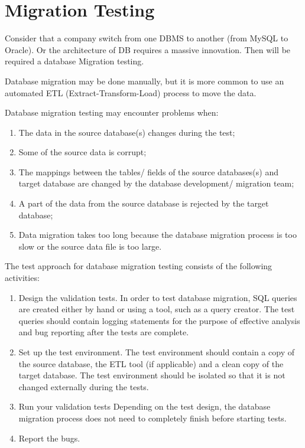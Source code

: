 \section{Migration Testing}
\label{sec:Migration Testing}

Consider that a company switch from one DBMS to another (from MySQL to Oracle). Or the architecture of DB requires a massive innovation. Then will be required a database Migration testing.

Database migration may be done manually, but it is more common to use an automated ETL (Extract-Transform-Load) process to move the data.

Database migration testing may encounter problems when:
\begin{enumerate}
 \item The data in the source database(s) changes during the test;
 \item Some of the source data is corrupt;
 \item The mappings between the tables/ fields of the source databases(s) and target database are changed by the database development/ migration team;
 \item A part of the data from the source database is rejected by the target database;
 \item Data migration takes too long because the database migration process is too slow or the source data file is too large.
 \end{enumerate}
 
 The test approach for database migration testing consists of the following activities:
 
\begin{enumerate}
 \item  
 Design the validation tests. In order to test database migration, SQL queries are created either by hand or using a tool, such as a query creator. The test queries should contain logging statements for the purpose of effective analysis and bug reporting after the tests are complete.
 \item Set up the test environment. The test environment should contain a copy of the source database, the ETL tool (if applicable) and a clean copy of the target database. The test environment should be isolated so that it is not changed externally during the tests.
 \item Run your validation tests Depending on the test design, the database migration process does not need to completely finish before starting tests.
 \item Report the bugs.
 \end{enumerate}
